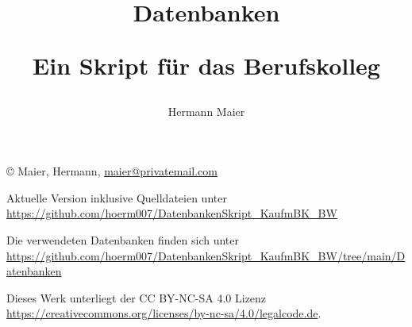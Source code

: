 \documentclass[a4paper,12pt, headsepline, ngerman]{scrartcl}
\begin{document}
	\setlength\parindent{0pt} %

	\rohead{}
	\cofoot[\pagemark]{\pagemark}
	\title{Datenbanken

	Ein Skript für das Berufskolleg}
	\author{Hermann Maier}
	\maketitle
	\thispagestyle{empty}
	\newpage
	\null\vfill
	\copyright \the\year{} Maier, Hermann, \href{mailto:maier@privatemail.com}{maier@privatemail.com}

    \begin{tcolorbox}\raggedright
        Aktuelle Version inklusive Quelldateien unter \href{https://github.com/hoerm007/DatenbankenSkript_KaufmBK_BW}{https://github.com/hoerm007/DatenbankenSkript\_KaufmBK\_BW}

        Die verwendeten Datenbanken finden sich unter
        {\small\href{https://github.com/hoerm007/DatenbankenSkript\_KaufmBK\_BW/tree/main/Datenbanken}{https://github.com/hoerm007/DatenbankenSkript\_KaufmBK\_BW/tree/main/Datenbanken}}
    \end{tcolorbox}

	Dieses Werk unterliegt der CC BY-NC-SA 4.0 Lizenz \href{https://creativecommons.org/licenses/by-nc-sa/4.0/legalcode.de}{https://creativecommons.org/licenses/by-nc-sa/4.0/legalcode.de}.
\end{document}
